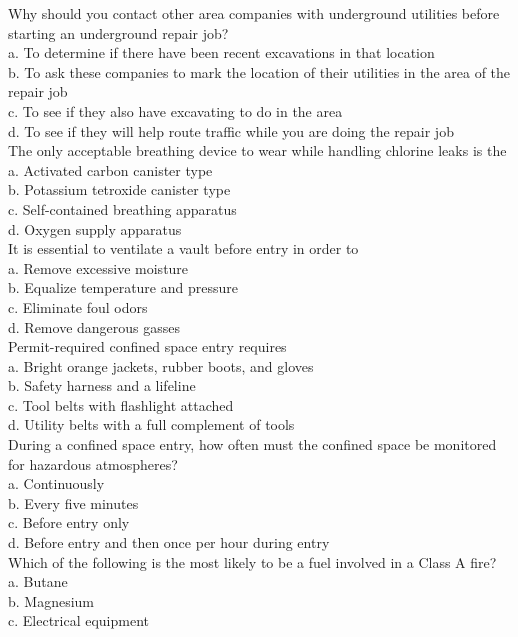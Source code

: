 Why should you contact other area companies with underground utilities before starting an underground repair job?\\
a.	 To determine if there have been recent excavations in that location\\
b.	 To ask these companies to mark the location of their utilities in the area of the repair job\\
c.	 To see if they also have excavating to do in the area\\
d.	 To see if they will help route traffic while you are doing the repair job\\
The only acceptable breathing device to wear while handling chlorine leaks is the\\
a. Activated carbon canister type\\
b. Potassium tetroxide canister type\\
c. Self-contained breathing apparatus\\
d.	Oxygen supply apparatus\\
It is essential to ventilate a vault before entry in order to\\
a. Remove excessive moisture\\
b. Equalize temperature and pressure\\
c. Eliminate foul odors\\
d.	 Remove dangerous gasses\\
Permit-required confined space entry requires\\
a. Bright orange jackets, rubber boots, and gloves\\
b. Safety harness and a lifeline\\
c. Tool belts with flashlight attached\\
d. Utility belts with a full complement of tools\\
During a confined space entry, how often must the confined space be monitored for hazardous atmospheres?\\
a.  Continuously\\
b.  Every five minutes\\
c. Before entry only\\
d. Before entry and then once per hour during entry\\
  Which of the following is the most likely to be a fuel involved in a Class A fire?\\
a. Butane\\
b. Magnesium\\
c. Electrical equipment\\
